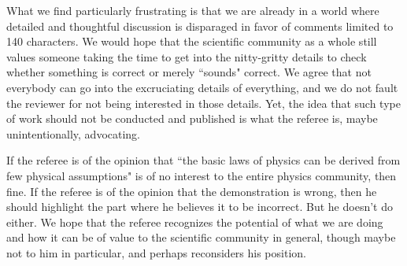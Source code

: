 \documentclass[10pt]{article}
\begin{document}
\begin{response}
What we find particularly frustrating is that we are already in a world where detailed and thoughtful discussion is disparaged in favor of comments limited to 140 characters. We would hope that the scientific community as a whole still values someone taking the time to get into the nitty-gritty details to check whether something is correct or merely ``sounds" correct. We agree that not everybody can go into the excruciating details of everything, and we do not fault the reviewer for not being interested in those details. Yet, the idea that such type of work should not be conducted and published is what the referee is, maybe unintentionally, advocating.

If the referee is of the opinion that ``the basic laws of physics can be derived from few physical assumptions" is of no interest to the entire physics community, then fine. If the referee is of the opinion that the demonstration is wrong, then he should highlight the part where he believes it to be incorrect. But he doesn't do either. We hope that the referee recognizes the potential of what we are doing and how it can be of value to the scientific community in general, though maybe not to him in particular, and perhaps reconsiders his position.

\end{response}
\end{document}
